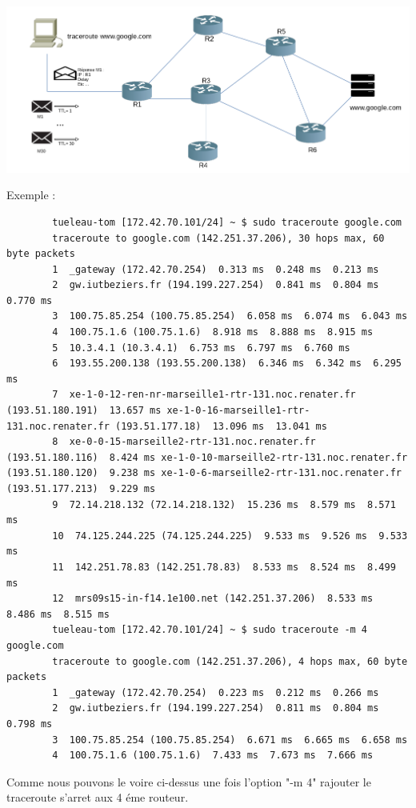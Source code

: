 \documentclass[5pt]{article}
\begin{document}
        \includegraphics[scale=0.5]{1.png} 

      
      Exemple :
      \begin{verbatim}
        tueleau-tom [172.42.70.101/24] ~ $ sudo traceroute google.com
        traceroute to google.com (142.251.37.206), 30 hops max, 60 byte packets
        1  _gateway (172.42.70.254)  0.313 ms  0.248 ms  0.213 ms
        2  gw.iutbeziers.fr (194.199.227.254)  0.841 ms  0.804 ms  0.770 ms
        3  100.75.85.254 (100.75.85.254)  6.058 ms  6.074 ms  6.043 ms
        4  100.75.1.6 (100.75.1.6)  8.918 ms  8.888 ms  8.915 ms
        5  10.3.4.1 (10.3.4.1)  6.753 ms  6.797 ms  6.760 ms
        6  193.55.200.138 (193.55.200.138)  6.346 ms  6.342 ms  6.295 ms
        7  xe-1-0-12-ren-nr-marseille1-rtr-131.noc.renater.fr (193.51.180.191)  13.657 ms xe-1-0-16-marseille1-rtr-131.noc.renater.fr (193.51.177.18)  13.096 ms  13.041 ms
        8  xe-0-0-15-marseille2-rtr-131.noc.renater.fr (193.51.180.116)  8.424 ms xe-1-0-10-marseille2-rtr-131.noc.renater.fr (193.51.180.120)  9.238 ms xe-1-0-6-marseille2-rtr-131.noc.renater.fr (193.51.177.213)  9.229 ms
        9  72.14.218.132 (72.14.218.132)  15.236 ms  8.579 ms  8.571 ms
        10  74.125.244.225 (74.125.244.225)  9.533 ms  9.526 ms  9.533 ms
        11  142.251.78.83 (142.251.78.83)  8.533 ms  8.524 ms  8.499 ms
        12  mrs09s15-in-f14.1e100.net (142.251.37.206)  8.533 ms  8.486 ms  8.515 ms
        tueleau-tom [172.42.70.101/24] ~ $ sudo traceroute -m 4 google.com
        traceroute to google.com (142.251.37.206), 4 hops max, 60 byte packets
        1  _gateway (172.42.70.254)  0.223 ms  0.212 ms  0.266 ms
        2  gw.iutbeziers.fr (194.199.227.254)  0.811 ms  0.804 ms  0.798 ms
        3  100.75.85.254 (100.75.85.254)  6.671 ms  6.665 ms  6.658 ms
        4  100.75.1.6 (100.75.1.6)  7.433 ms  7.673 ms  7.666 ms

      \end{verbatim}
      Comme nous pouvons le voire ci-dessus une fois l'option "-m 4" rajouter le traceroute s'arret aux 4 éme routeur.
      
\end{document}
